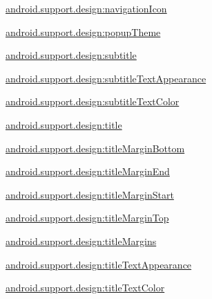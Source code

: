 {\ttfamily \hyperlink{classandroid_1_1support_1_1design_1_1R_1_1styleable_afd9054878cb1ec4c07888ebaf463242c}{android.\+support.\+design\+:navigation\+Icon}}

{\ttfamily \hyperlink{classandroid_1_1support_1_1design_1_1R_1_1styleable_aa248f853ab7158fb2c598abe10eab5c8}{android.\+support.\+design\+:popup\+Theme}}

{\ttfamily \hyperlink{classandroid_1_1support_1_1design_1_1R_1_1styleable_a976eebe1f58a714dc8273f897a889fcc}{android.\+support.\+design\+:subtitle}}

{\ttfamily \hyperlink{classandroid_1_1support_1_1design_1_1R_1_1styleable_abb253180e44bdd9eff96211ecbe332cf}{android.\+support.\+design\+:subtitle\+Text\+Appearance}}

{\ttfamily \hyperlink{classandroid_1_1support_1_1design_1_1R_1_1styleable_a0924fc01dfcdf4dd5e6b63188a1248f3}{android.\+support.\+design\+:subtitle\+Text\+Color}}

{\ttfamily \hyperlink{classandroid_1_1support_1_1design_1_1R_1_1styleable_abec4f071992436f684430ab2be771dcb}{android.\+support.\+design\+:title}}

{\ttfamily \hyperlink{classandroid_1_1support_1_1design_1_1R_1_1styleable_a0a632f483c823b4ce646fd30c094cb6e}{android.\+support.\+design\+:title\+Margin\+Bottom}}

{\ttfamily \hyperlink{classandroid_1_1support_1_1design_1_1R_1_1styleable_a31063956df1fcf227bb270b3d99d655a}{android.\+support.\+design\+:title\+Margin\+End}}

{\ttfamily \hyperlink{classandroid_1_1support_1_1design_1_1R_1_1styleable_ad039c0dbf8952631ed1ef085c60c5c16}{android.\+support.\+design\+:title\+Margin\+Start}}

{\ttfamily \hyperlink{classandroid_1_1support_1_1design_1_1R_1_1styleable_a29bca0a3147a1442fad7801b4d23fc68}{android.\+support.\+design\+:title\+Margin\+Top}}

{\ttfamily \hyperlink{classandroid_1_1support_1_1design_1_1R_1_1styleable_ae49b23069bb886262bf59ab027045954}{android.\+support.\+design\+:title\+Margins}}

{\ttfamily \hyperlink{classandroid_1_1support_1_1design_1_1R_1_1styleable_aad88a5a97376d2cb38271639cec1ca2c}{android.\+support.\+design\+:title\+Text\+Appearance}}

{\ttfamily \hyperlink{classandroid_1_1support_1_1design_1_1R_1_1styleable_a604b5e782f3ef15da00397e90979933b}{android.\+support.\+design\+:title\+Text\+Color}}

